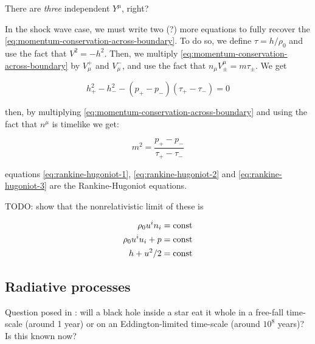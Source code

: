 \documentclass[main.tex]{subfiles}
\begin{document}
\begin{greenbox}
  There are \emph{three} independent \(Y^\mu\), right?
\end{greenbox}

In the shock wave case, we must write two (?) more equations to fully recover the \eqref{eq:momentum-conservation-across-boundary}. To do so, we define \(\tau = h/\rho_0\) and use the fact that \(V^2 = -h^2\).
Then, we multiply \eqref{eq:momentum-conservation-across-boundary} by \(V_{\mu}^{+}\) and \(V_{\mu}^{-}\), and use the fact that \(n_\mu V^\mu_{\pm} = m \tau_{\pm}\). We get

\begin{equation} \label{eq:rankine-hugoniot-2}
    h^2_+ - h^2_- - (p_+ - p_-)(\tau_+ - \tau_-) = 0
\end{equation}

then, by multiplying \eqref{eq:momentum-conservation-across-boundary} and using the fact that \(n^\mu\) is timelike we get:

\begin{equation}\label{eq:rankine-hugoniot-3}
    m^2 = \frac{p_+ - p_-}{\tau_+ - \tau_-}
\end{equation}

equations \eqref{eq:rankine-hugoniot-1}, \eqref{eq:rankine-hugoniot-2} and \eqref{eq:rankine-hugoniot-3} are the Rankine-Hugoniot equations.

\begin{greenbox}
  TODO: show that the nonrelativistic limit of these is

  \begin{subequations}
  \begin{align}
    \rho_0 u^i n_i &= \operatorname{const}  \\
    \rho_0 u^i u_i + p &= \operatorname{const}  \\
    h + u^2 /2 &= \operatorname{const}
  \end{align}
  \end{subequations}
\end{greenbox}

\subsection{Radiative processes}

\begin{greenbox}
  Question posed in \cite[Introduction]{ThorneFLammmangZytkow:1981feb}: will a black hole inside a star eat it whole in a free-fall time-scale (around 1 year) or on an Eddington-limited time-scale (around \(10^8\) years)?
  Is this known now?
\end{greenbox}
\end{document}
